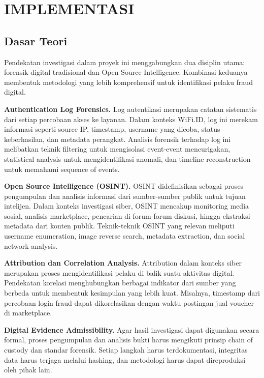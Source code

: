 \documentclass{ittelkom_ppi}
\begin{document}
\section{IMPLEMENTASI}

\subsection{Dasar Teori}
\justifying

Pendekatan investigasi dalam proyek ini menggabungkan dua disiplin utama: forensik digital tradisional dan Open Source Intelligence. Kombinasi keduanya membentuk metodologi yang lebih komprehensif untuk identifikasi pelaku fraud digital.

\textbf{Authentication Log Forensics.} Log autentikasi merupakan catatan sistematis dari setiap percobaan akses ke layanan. Dalam konteks WiFi.ID, log ini merekam informasi seperti source IP, timestamp, username yang dicoba, status keberhasilan, dan metadata perangkat. Analisis forensik terhadap log ini melibatkan teknik filtering untuk mengisolasi event-event mencurigakan, statistical analysis untuk mengidentifikasi anomali, dan timeline reconstruction untuk memahami sequence of events.

\textbf{Open Source Intelligence (OSINT).} OSINT didefinisikan sebagai proses pengumpulan dan analisis informasi dari sumber-sumber publik untuk tujuan intelijen. Dalam konteks investigasi siber, OSINT mencakup monitoring media sosial, analisis marketplace, pencarian di forum-forum diskusi, hingga ekstraksi metadata dari konten publik. Teknik-teknik OSINT yang relevan meliputi username enumeration, image reverse search, metadata extraction, dan social network analysis.

\textbf{Attribution dan Correlation Analysis.} Attribution dalam konteks siber merupakan proses mengidentifikasi pelaku di balik suatu aktivitas digital. Pendekatan korelasi menghubungkan berbagai indikator dari sumber yang berbeda untuk membentuk kesimpulan yang lebih kuat. Misalnya, timestamp dari percobaan login fraud dapat dikorelasikan dengan waktu postingan jual voucher di marketplace.

\textbf{Digital Evidence Admissibility.} Agar hasil investigasi dapat digunakan secara formal, proses pengumpulan dan analisis bukti harus mengikuti prinsip chain of custody dan standar forensik. Setiap langkah harus terdokumentasi, integritas data harus terjaga melalui hashing, dan metodologi harus dapat direproduksi oleh pihak lain.
\end{document}
